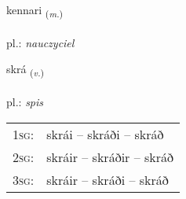 \documentclass[frontgrid, backgrid]{flacards}\usepackage[]{graphicx}\usepackage[]{xcolor}
\begin{document}
\renewcommand{\blhead}{\vskip5pt {\small\bfseries\footnotesize Nafnorð | Noun }}
\renewcommand{\bcfoot}{\vskip5pt \hspace{2pt}{\small\bfseries\footnotesize 1K}}


{kennari \small{\textsubscript{(\textit{m.})}} \\[1ex] %
\textphonetic{[cʰɛnarɪ]} \\
pl.: \emph{nauczyciel} \\  [2ex]
\renewcommand*{\arraystretch}{0.8}
}

\renewcommand{\flhead}{\vskip5pt \fboxsep=0pt {\small\bfseries\footnotesize Sagnorð | Verb}}
\renewcommand{\fcfoot}{\vskip5pt \fboxsep=0pt \hspace{2pt}{\small\bfseries\footnotesize 1K}}

\renewcommand{\blhead}{\vskip5pt {\small\bfseries\footnotesize Sagnorð | Verb }}
\renewcommand{\bcfoot}{\vskip5pt \hspace{2pt}{\small\bfseries\footnotesize 1K}}


{skrá \small{\textsubscript{(\textit{v.})}} \\[1ex] %
\textphonetic{[skrauː]} \\
pl.: \emph{spis} \\  [2ex]
\renewcommand*{\arraystretch}{0.8}
\begin{tabular}{p{1cm}l}
\textsc{1sg}: & skrái -- skráði -- skráð \\ 
\textsc{2sg}: & skráir -- skráðir -- skráð \\ 
\textsc{3sg}: & skráir -- skráði -- skráð \\ 
\end{tabular}
}

\renewcommand{\flhead}{\vskip5pt \fboxsep=0pt {\small\bfseries\footnotesize Nafnorð | Noun}}
\renewcommand{\fcfoot}{\vskip5pt \fboxsep=0pt \hspace{2pt}{\small\bfseries\footnotesize 1K}}
\end{document}
